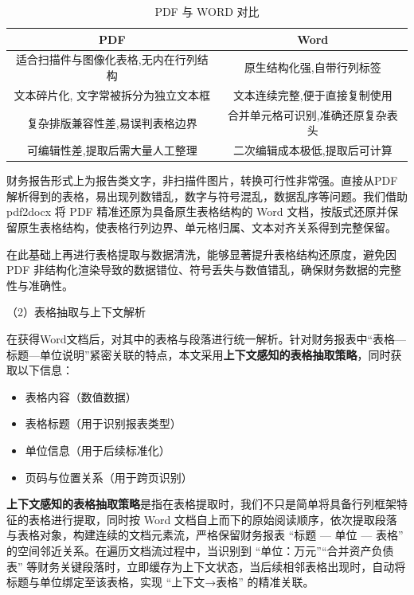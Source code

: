 \documentclass[withoutpreface,bwprint]{cumcmthesis} %
\begin{document}
\begin{table}[htbp]
	\centering
	\caption{PDF 与 WORD 对比}
	\begin{tabular}{cc}
		\toprule  %
		PDF                 & Word              \\
		\midrule  %
		适合扫描件与图像化表格,无内在行列结构 & 原生结构化强,自带行列标签     \\
		文本碎片化, 文字常被拆分为独立文本框 & 文本连续完整,便于直接复制使用   \\
		复杂排版兼容性差,易误判表格边界    & 合并单元格可识别,准确还原复杂表头 \\
		可编辑性差,提取后需大量人工整理    & 二次编辑成本极低,提取后可计算   \\
		\bottomrule %
	\end{tabular}
\end{table}

财务报告形式上为报告类文字，非扫描件图片，转换可行性非常强。直接从PDF解析得到的表格，易出现列数错乱，数字与符号混乱，数据乱序等问题。我们借助 pdf2docx 将 PDF 精准还原为具备原生表格结构的 Word 文档，按版式还原并保留原生表格结构，使表格行列边界、单元格归属、文本对齐关系得到完整保留。

在此基础上再进行表格提取与数据清洗，能够显著提升表格结构还原度，避免因 PDF 非结构化渲染导致的数据错位、符号丢失与数值错乱，确保财务数据的完整性与准确性。


（2）表格抽取与上下文解析

在获得Word文档后，对其中的表格与段落进行统一解析。针对财务报表中“表格—标题—单位说明”紧密关联的特点，本文采用\textbf{上下文感知的表格抽取策略}，同时获取以下信息：

\begin{itemize}
	\item 表格内容（数值数据）
	\item 表格标题（用于识别报表类型）
	\item 单位信息（用于后续标准化）
	\item 页码与位置关系（用于跨页识别）
\end{itemize}

\textbf{上下文感知的表格抽取策略}是指在表格提取时，我们不只是简单将具备行列框架特征的表格进行提取，同时按 Word 文档自上而下的原始阅读顺序，依次提取段落与表格对象，构建连续的文档元素流，严格保留财务报表 “标题 — 单位 — 表格” 的空间邻近关系。在遍历文档流过程中，当识别到 “单位：万元”“合并资产负债表” 等财务关键段落时，立即缓存为上下文状态，当后续相邻表格出现时，自动将标题与单位绑定至该表格，实现 “上下文→表格” 的精准关联。
\end{document}
